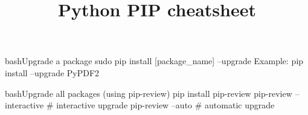 \documentclass[10pt,a4paper]{article}
\title{\color{w3schools}Python PIP cheatsheet
}
\begin{document}
\maketitle

\small
\begin{multicols}{3}

\thispagestyle{empty}
\scriptsize



\begin{codebox}{bash}{Upgrade a package}
sudo pip install [package_name] --upgrade
Example: pip install --upgrade PyPDF2

\end{codebox}

\begin{codebox}{bash}{Upgrade all packages (using pip-review)}
pip install pip-review
pip-review --interactive # interactive upgrade
pip-review  --auto       # automatic upgrade

\end{codebox}


\AtNextBibliography{\footnotesize}
\printbibliography  
\end{multicols}
\end{document}
